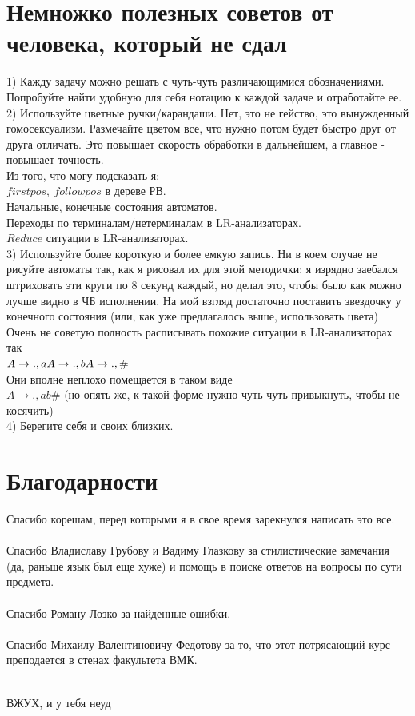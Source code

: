 \documentclass[14pt]{extreport}
\begin{document}
	\chapter{Немножко полезных советов от человека, который не сдал}
	1) Кажду задачу можно решать с чуть-чуть различающимися обозначениями. Попробуйте найти
	удобную для себя нотацию к каждой задаче и отработайте ее.\\
	2) Используйте цветные ручки/карандаши. Нет, это не гейство, это вынужденный гомосексуализм.
	Размечайте цветом все, что нужно потом будет быстро друг от друга отличать. Это повышает
	скорость обработки в дальнейшем, а главное - повышает точность.\\
	Из того, что могу подсказать я:\\
	$firstpos,\ followpos$ в дереве РВ.\\
	Начальные, конечные состояния автоматов.\\
	Переходы по терминалам/нетерминалам в LR-анализаторах.\\
	$Reduce$ ситуации в LR-анализаторах.\\
	3) Используйте более короткую и более емкую запись. Ни в коем случае не рисуйте автоматы так,
	как я рисовал их для этой методички: я изрядно заебался штриховать эти круги по 8 секунд
	каждый, но делал это, чтобы было как можно лучше видно в ЧБ исполнении. На мой взгляд
	достаточно поставить звездочку у конечного состояния (или, как уже предлагалось выше,
	использовать цвета)\\
	Очень не советую полность расписывать похожие ситуации в LR-анализаторах так\\
	$ A \to .,a \\ A \to .,b \\ A \to .,\#$\\
	Они вполне неплохо помещается в таком виде\\
	$A \to .,ab\#$ (но опять же, к такой форме нужно чуть-чуть привыкнуть, чтобы не косячить)\\
	4) Берегите себя и своих близких.
	\chapter{Благодарности}
	Спасибо корешам, перед которыми я в свое время зарекнулся написать это все.\\\\
	Спасибо Владиславу Грубову и Вадиму Глазкову за стилистические замечания (да, раньше
	язык был еще хуже) и помощь в поиске ответов на вопросы по сути предмета.\\\\
	Спасибо Роману Лозко за найденные ошибки.\\\\
	Спасибо Михаилу Валентиновичу Федотову за то, что этот потрясающий курс преподается в
	стенах факультета ВМК.\\\\
	\vspace{270pt}
	\begin{center}
		\large{ВЖУХ, и у тебя неуд}\\	
	\end{center}

	
	
	
	
	
	
	
\end{document}
